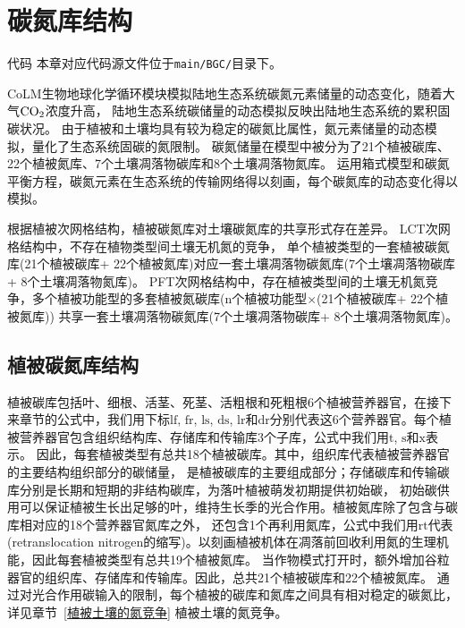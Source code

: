 \chapter{碳氮库结构}\label{碳氮库结构}
\begin{mymdframed}{代码}
  本章对应代码源文件位于\texttt{main/BGC/}目录下。
\end{mymdframed}

CoLM生物地球化学循环模块模拟陆地生态系统碳氮元素储量的动态变化，随着大气$\rm CO_2$浓度升高，
陆地生态系统碳储量的动态模拟反映出陆地生态系统的累积固碳状况。
由于植被和土壤均具有较为稳定的碳氮比属性，氮元素储量的动态模拟，量化了生态系统固碳的氮限制。
碳氮储量在模型中被分为了21个植被碳库、22个植被氮库、7个土壤凋落物碳库和8个土壤凋落物氮库。
运用箱式模型和碳氮平衡方程，碳氮元素在生态系统的传输网络得以刻画，每个碳氮库的动态变化得以模拟。


根据植被次网格结构，植被碳氮库对土壤碳氮库的共享形式存在差异。
LCT次网格结构中，不存在植物类型间土壤无机氮的竞争，
单个植被类型的一套植被碳氮库(21个植被碳库+ 22个植被氮库)对应一套土壤凋落物碳氮库(7个土壤凋落物碳库+ 8个土壤凋落物氮库)。
PFT次网格结构中，存在植被类型间的土壤无机氮竞争，多个植被功能型的多套植被氮碳库(n个植被功能型×(21个植被碳库+ 22个植被氮库))
共享一套土壤凋落物碳氮库(7个土壤凋落物碳库+ 8个土壤凋落物氮库)。


\section{植被碳氮库结构}\label{植被碳氮库结构}
植被碳库包括叶、细根、活茎、死茎、活粗根和死粗根6个植被营养器官，在接下来章节的公式中，我们用下标${\mathrm {lf}}$, ${\mathrm {fr}}$, ${\mathrm {ls}}$, ${\mathrm {ds}}$, ${\mathrm {lr}}$和${\mathrm {dr}}$分别代表这6个营养器官。每个植被营养器官包含组织结构库、存储库和传输库3个子库，公式中我们用${\mathrm {t}}$, ${\mathrm {s}}$和${\mathrm {x}}$表示。
因此，每套植被类型有总共18个植被碳库。其中，组织库代表植被营养器官的主要结构组织部分的碳储量，
是植被碳库的主要组成部分；存储碳库和传输碳库分别是长期和短期的非结构碳库，为落叶植被萌发初期提供初始碳，
初始碳供用可以保证植被生长出足够的叶，维持生长季的光合作用。植被氮库除了包含与碳库相对应的18个营养器官氮库之外，
还包含1个再利用氮库，公式中我们用${\mathrm {rt}}$代表(retranslocation nitrogen的缩写)。以刻画植被机体在凋落前回收利用氮的生理机能，因此每套植被类型有总共19个植被氮库。
当作物模式打开时，额外增加谷粒器官的组织库、存储库和传输库。因此，总共21个植被碳库和22个植被氮库。
通过对光合作用碳输入的限制，每个植被的碳库和氮库之间具有相对稳定的碳氮比，详见章节~\ref{植被土壤的氮竞争} 植被土壤的氮竞争。

